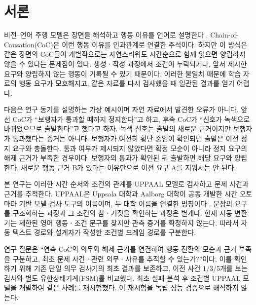 \section{서론}
\label{sec:intro}

\begin{revision}

비전--언어 주행 모델은 장면을 해석하고 행동 이유를 언어로 설명한다 \cite{sima2024drivelm,tian2024drivevlm}. Chain-of-Causation(CoC)은 이런 행동 이유를 인과관계로 연결한 주석이다. 하지만 이 방식은 같은 장면의 CoC들이 개별적으로는 자연스러워도 시간순으로 함께 읽으면 양립하지 않을 수 있다는 문제점이 있다. 생성ㆍ작성 과정에서 조건이 누락되거나, 앞서 제시한 요구와 양립하지 않는 행동이 기록될 수 있기 때문이다. 이러한 불일치 때문에 학습 자료의 행동 요구가 모호해지고, 같은 자료를 다시 검사했을 때 일관된 결과를 얻기 어렵다.

다음은 연구 동기를 설명하는 가상 예시이며 자연 자료에서 발견한 오류가 아니다. 앞선 CoC가 ``보행자가 통과할 때까지 정지한다''고 하고, 후속 CoC가 ``신호가 녹색으로 바뀌었으므로 출발한다''고 했다고 하자. 녹색 신호는 출발의 새로운 근거이지만 보행자가 통과했다는 증거는 아니다. 보행자가 여전히 횡단 중임이 확인되면 출발은 이전 정지 요구와 충돌한다. 통과 여부가 제시되지 않았다면 확정 모순이 아니라 정지 요구의 해제 근거가 부족한 경우이다. 보행자의 통과가 확인된 뒤 출발하면 해당 요구와 양립한다. 새로운 행동 근거 B가 있다는 이유만으로 이전 요구 A를 지워서는 안 된다.

본 연구는 이러한 시간 순서와 조건의 관계를 UPPAAL 모델로 검사하고 문제 사건과 근거를 추적한다. UPPAAL은 Uppsala 대학과 Aalborg 대학이 공동 개발한 시간 오토마타 기반 모델 검사 도구의 이름이며, 두 대학 이름을 연결한 명칭이다 \cite{uppaalofficial,uppaalname,behrmann2004uppaal}. 문장의 요구를 구조화하는 과정과 그 조건의 참ㆍ거짓을 확인하는 과정은 별개다. 현재 자동 변환기는 제한된 영어 행동ㆍ조건 문구를 찾지만 관측 증거를 확정하지 않는다. 따라서 자동 텍스트 경로와 설계자가 작성한 조건별 프레임 경로를 구분한다.

\begin{figure}[t]
\centering
\color{revisionblue}

\label{fig:overview-pipeline}
\end{figure}

연구 질문은 ``연속 CoC의 의무와 해제 근거를 연결하여 행동 전환의 모순과 근거 부족을 구분하고, 최초 문제 사건ㆍ관련 의무ㆍ사유를 추적할 수 있는가?''이다. 이를 확인하기 위해 기존 단일 의무 검사기의 최초 결과를 보존하고, 이전 사건 1/3/5개를 보는 검사와 별도 유한상태기계(FSM)를 비교했다. 최초 실패 분석 후 조건별 UPPAAL 모델을 개발하여 같은 사례를 재시험했다. 이 재시험을 독립 성능 검증으로 해석하지 않는다.


\end{revision}

